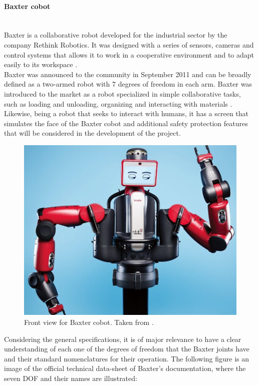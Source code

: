 \documentclass[11pt]{report} %
\newcommand{\subsubsubsection}[1]{\paragraph{#1}\mbox{}\\}
\begin{document}
\subsubsubsection{Baxter cobot}

Baxter is a collaborative robot developed for the industrial sector by the company Rethink Robotics. It was designed with a series of sensors, cameras and control systems that allows it to work in a cooperative environment and to adapt easily to its workspace \citep{cite_rethink_robotics_official_page}.\\

Baxter was announced to the community in September 2011 and can be broadly defined as a two-armed robot with 7 degrees of freedom in each arm. Baxter was introduced to the market as a robot specialized in simple collaborative tasks, such as loading and unloading, organizing and interacting with materials \citep{cite_sdk_baxter_rethink_robotics}. Likewise, being a robot that seeks to interact with humans, it has a screen that simulates the face of the Baxter cobot and additional safety protection features that will be considered in the development of the project.

\begin{figure}[H]
    \centering
    \includegraphics[width=0.75\linewidth]{assets/imgs/reference_framework/main_baxter.jpg}
    \caption{Front view for Baxter cobot. Taken from \citep{cite_youtube_baxter_robot_future_employee}.} 
    \label{fig_baxter_main_image}
\end{figure}

Considering the general specifications, it is of major relevance to have a clear understanding of each one of the degrees of freedom that the Baxter joints have and their standard nomenclatures for their operation. The following figure is an image of the official technical data-sheet of Baxter's documentation, where the seven DOF and their names are illustrated:
\end{document}
